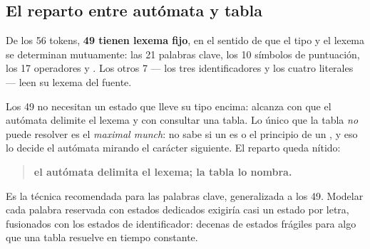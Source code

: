 \documentclass[11pt,a4paper]{article}
\begin{document}
\begin{center}
\end{center}

\subsection{El reparto entre autómata y tabla}
\label{sec:tabla}

De los 56 tokens, \textbf{49 tienen lexema fijo}, en el sentido de que el tipo y el lexema se
determinan mutuamente: las 21 palabras clave, los 10 símbolos de puntuación, los 17 operadores y
. Los otros 7 --- los tres identificadores y los cuatro literales --- leen su lexema del
fuente.

Los 49 no necesitan un estado que lleve su tipo encima: alcanza con que el autómata delimite el
lexema y con consultar una tabla. Lo único que la tabla \emph{no} puede resolver es el
\emph{maximal munch}: no sabe si un \lex{>} es  o el principio de un
, y eso lo decide el autómata mirando el carácter siguiente. El reparto queda
nítido:

\begin{quote}
\textbf{el autómata delimita el lexema; la tabla lo nombra.}
\end{quote}

Es la técnica recomendada para las palabras clave, generalizada a los 49. Modelar cada palabra
reservada con estados dedicados exigiría casi un estado por letra, fusionados con los estados de
identificador: decenas de estados frágiles para algo que una tabla resuelve en tiempo constante.

\end{document}
